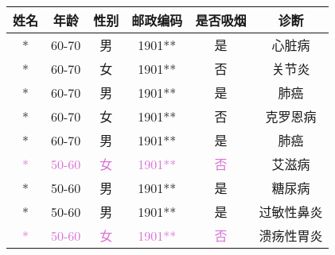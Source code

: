 \begin{tabular}{cccccc}
\toprule
    \textbf{姓名} & \textbf{年龄} & \textbf{性别} & \textbf{邮政编码} & \textbf{是否吸烟} & \textbf{诊断} \\ \midrule
    * & 60-70 & 男 & 1901** & 是 & 心脏病 \\ 
    * & 60-70 & 女 & 1901** & 否 & 关节炎 \\ 
    * & 60-70 & 男 & 1901** & 是 & 肺癌 \\ 
    * & 60-70 & 女 & 1901** & 否 & 克罗恩病 \\ 
    * & 60-70 & 男 & 1901** & 是 & 肺癌 \\ 
    \textcolor{Orchid}* & \textcolor{Orchid}{50-60} & \textcolor{Orchid}{女} & \textcolor{Orchid}{1901**} & \textcolor{Orchid}{否} & 艾滋病 \\ 
    * & 50-60 & 男 & 1901** & 是 & 糖尿病 \\ 
    * & 50-60 & 男 & 1901** & 是 & 过敏性鼻炎 \\ 
    \textcolor{Orchid}* & \textcolor{Orchid}{50-60} & \textcolor{Orchid}{女} & \textcolor{Orchid}{1901**} & \textcolor{Orchid}{否} & 溃疡性胃炎 \\ \bottomrule
\end{tabular}
